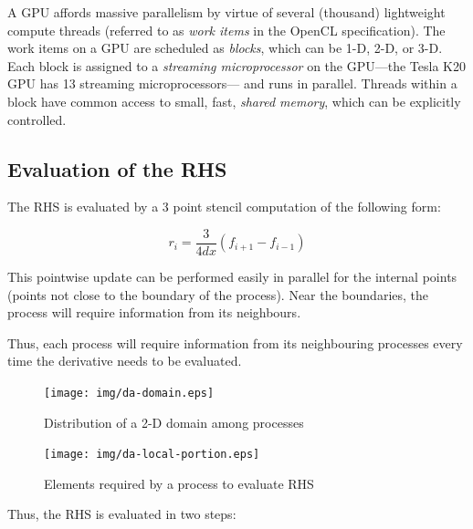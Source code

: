 \documentclass{article}
\begin{document}
    A GPU affords massive parallelism by virtue of several (thousand)
    lightweight compute threads (referred to as \emph{work items} in the OpenCL specification).
    The work items on a GPU are scheduled as \emph{blocks},
    which can be 1-D, 2-D, or 3-D.
    Each block is assigned to a \emph{streaming microprocessor}
    on the GPU---the Tesla K20 GPU has 13 streaming microprocessors---
    and runs in parallel.
    Threads within a block have common access to small, fast,
    \emph{shared memory}, which can be explicitly controlled.

    \subsection{Evaluation of the RHS}

        The RHS is evaluated by a 3 point stencil computation of
        the following form:

        \begin{equation*}
            r_i = \frac{3}{4dx} (f_{i+1} - f_{i-1})
        \end{equation*}

        This pointwise update can be performed easily in parallel
        for the internal points (points not close to the boundary of the process).
        Near the boundaries, the process will require information from its
        neighbours.

        Thus, each process will require information from its
        neighbouring processes every time the derivative needs to be evaluated.

        \begin{figure}[h]
        \begin{center}
        \texttt{[image: img/da-domain.eps]}
        \end{center}
        \caption{Distribution of a 2-D domain among processes}
        \label{fig:da-domain}
        \end{figure}

        \begin{figure}[h]
        \begin{center}
        \texttt{[image: img/da-local-portion.eps]}
        \end{center}
        \caption{Elements required by a process to evaluate RHS}
        \label{fig:da-local-portion}
        \end{figure}

        Thus, the RHS is evaluated in two steps:
\end{document}

